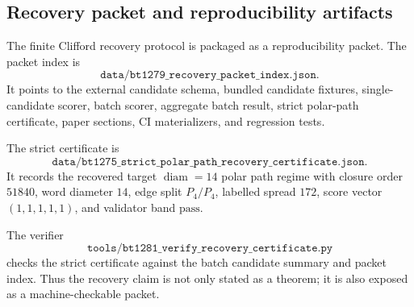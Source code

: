 \subsection{Recovery packet and reproducibility artifacts}
\label{sec:bt1282-recovery-packet-reproducibility}

The finite Clifford recovery protocol is packaged as a reproducibility packet.  The packet index is
\[
\texttt{data/bt1279\_recovery\_packet\_index.json}.
\]
It points to the external candidate schema, bundled candidate fixtures, single-candidate scorer, batch scorer, aggregate batch result, strict polar-path certificate, paper sections, CI materializers, and regression tests.

The strict certificate is
\[
\texttt{data/bt1275\_strict\_polar\_path\_recovery\_certificate.json}.
\]
It records the recovered target \(\operatorname{diam}=14\) polar path regime with closure order \(51840\), word diameter \(14\), edge split \(P_4/P_4\), labelled spread \(172\), score vector \((1,1,1,1,1)\), and validator band \(\mathrm{pass}\).

The verifier
\[
\texttt{tools/bt1281\_verify\_recovery\_certificate.py}
\]
checks the strict certificate against the batch candidate summary and packet index.  Thus the recovery claim is not only stated as a theorem; it is also exposed as a machine-checkable packet.
